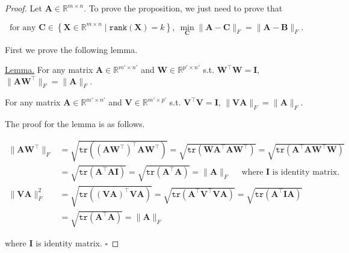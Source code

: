 \documentclass{article}
\newcommand{\whiteqed}{\hfill $\square$\par}
\newcommand{\set}[1]{\left\{#1\right\}}
\newcommand{\bd}[1]{\boldsymbol{#1}}
\begin{document}
\vspace{2em}

\begin{proof}
    Let $\bd{A}\in\mathbb{R}^{m\times n}$. To prove the proposition, we just need to prove that

    \vspace{-1em}
    $$\text{for any }\bd{C}\in\set{\bd{X}\in\mathbb{R}^{m\times n}\mid\mathtt{rank}(\bd{X})=k},\ \underset{\bd{C}}{\min}\|\bd{A}-\bd{C}\|_F=\|\bd{A}-\bd{B}\|_F.$$

    \vspace{1em} \hspace{1.3em}
    First we prove the following lemma.

    \hspace{1.3em}
    \underline{Lemma.} For any matrix $\bd{A}\in\mathbb{R}^{m'\times n'}$ and $\bd{W}\in\mathbb{R}^{p'\times n'}$ s.t. $\bd{W}^\top\bd{W}=\bd{I}$, $\|\bd{A}\bd{W}^\top\|_F=\|\bd{A}\|_F.$

    \hspace{5.1em} For any matrix $\bd{A}\in\mathbb{R}^{m'\times n'}$ and $\bd{V}\in\mathbb{R}^{m'\times p'}$ s.t. $\bd{V}^\top\bd{V}=\bd{I}$, $\|\bd{V}\bd{A}\|_F=\|\bd{A}\|_F.$

    \hspace{1.3em}
    The proof for the lemma is as follows.

    \vspace{-2.5em}
    \begin{align*}
        \|\bd{A}\bd{W}^\top\|_F &= \sqrt{\mathtt{tr}\left(\left(\bd{A}\bd{W}^\top\right)^\top\bd{A}\bd{W}^\top\right)} = \sqrt{\mathtt{tr}\left(\bd{W}\bd{A}^\top\bd{A}\bd{W}^\top\right)} = \sqrt{\mathtt{tr}\left(\bd{A}^\top\bd{A}\bd{W}^\top\bd{W}\right)} \\
        &= \sqrt{\mathtt{tr}\left(\bd{A}^\top\bd{A}\bd{I}\right)} = \sqrt{\mathtt{tr}\left(\bd{A}^\top\bd{A}\right)} = \|\bd{A}\|_F \quad\text{ where $\bd{I}$ is identity matrix.}\\
        \|\bd{V}\bd{A}\|_F^2 &= \sqrt{\mathtt{tr}\left(\left(\bd{VA}\right)^\top\bd{VA}\right)} = \sqrt{\mathtt{tr}\left(\bd{A}^\top\bd{V}^\top\bd{V}\bd{A}\right)} = \sqrt{\mathtt{tr}\left(\bd{A}^\top\bd{I}\bd{A}\right)} \\
        &= \sqrt{\mathtt{tr}\left(\bd{A}^\top\bd{A}\right)} = \|\bd{A}\|_F
    \end{align*}

    \vspace{-3.3em} \hspace{26em}
    where $\bd{I}$ is identity matrix. \whiteqed


\end{proof}
\end{document}
